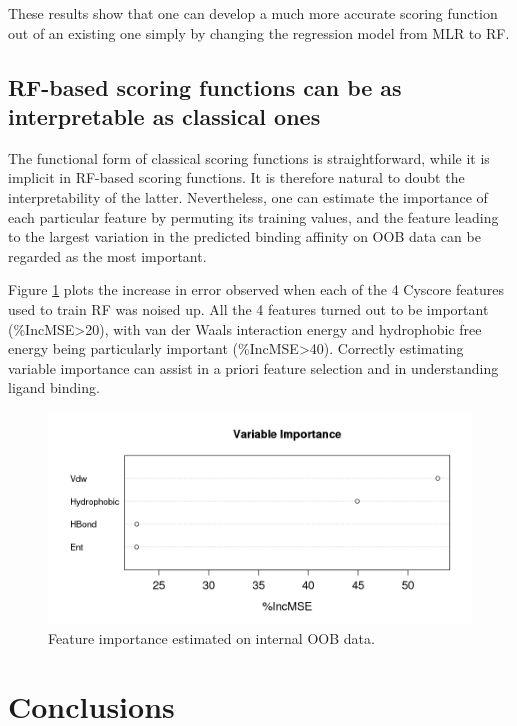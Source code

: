 \documentclass[journal=jacsat,manuscript=article]{achemso}
\begin{document}
These results show that one can develop a much more accurate scoring function out of an existing one simply by changing the regression model from MLR to RF.

\subsection{RF-based scoring functions can be as interpretable as classical ones}

The functional form of classical scoring functions is straightforward, while it is implicit in RF-based scoring functions. It is therefore natural to doubt the interpretability of the latter. Nevertheless, one can estimate the importance of each particular feature by permuting its training values, and the feature leading to the largest variation in the predicted binding affinity on OOB data can be regarded as the most important.

Figure \ref{fig:varimp} plots the increase in error observed when each of the 4 Cyscore features used to train RF was noised up. All the 4 features turned out to be important (\%IncMSE\textgreater 20), with van der Waals interaction energy and hydrophobic free energy being particularly important (\%IncMSE\textgreater 40). Correctly estimating variable importance can assist in a priori feature selection and in understanding ligand binding.

\begin{figure}[h]
\includegraphics[width=1.4\linewidth,natwidth=960,natheight=480]{../rfcyscore/x4/rf/trn-1105.png}
\caption{Feature importance estimated on internal OOB data.}
\label{fig:varimp}
\end{figure}

\section{Conclusions}
\end{document}

